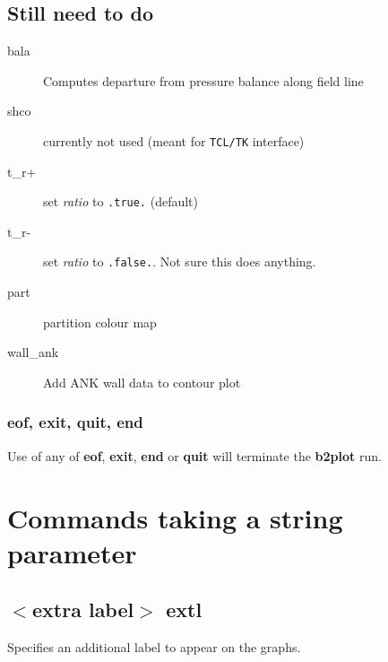 \documentclass[a4paper,10pt]{report}
\newcommand{\btwoplot}{{\bf b2plot} }
\begin{document}
\subsection{Still need to do}

\begin{description}
\item[bala] \label{sec:bala} Computes departure from pressure balance along field line
\item[shco] \label{sec:shco} currently not used (meant for {\tt TCL/TK} interface)
\item[t\_r+] \label{sec:t_r+} set {\em ratio} to {\tt .true.} (default)
\item[t\_r-] \label{sec:t_r-} set {\em ratio} to {\tt .false.}. Not sure this does anything.
\item[part] \label{sec:part} partition colour map
\item[wall\_ank] \label{sec:wall_ank} Add ANK wall data to contour plot
\end{description}

\subsubsection{eof, exit, quit, end}\label{sec:eof}\label{sec:exit}\label{sec:quit}\label{sec:end}
Use of any of {\bf eof}, {\bf exit}, {\bf end} or {\bf quit} will terminate the \btwoplot run.


\section{Commands taking a string parameter}

\subsection{$<$extra label$>$ extl}\label{sec:extl}
Specifies an additional label to appear on the graphs.
\end{document}
